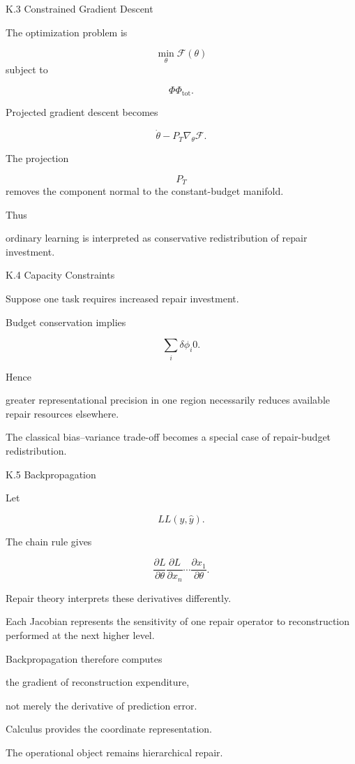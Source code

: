 \documentclass[12pt,oneside]{article}
\theoremstyle{plain}
\theoremstyle{definition}
\theoremstyle{remark}
\begin{document}
K.3 Constrained Gradient Descent

The optimization problem is

\[
\min_\theta
\mathcal F(\theta)
\]
subject to

\[
\Phi
\Phi_{\mathrm{tot}}.
\]

Projected gradient descent becomes

\[
\dot\theta
- 

P_T
\nabla_\theta
\mathcal F.
\]

The projection

\[
P_T
\]
removes the component normal to the constant-budget manifold.

Thus

ordinary learning is interpreted as conservative redistribution of repair investment.


K.4 Capacity Constraints

Suppose one task requires increased repair investment.

Budget conservation implies

\[
\sum_i
\delta\phi_i
0. 

\]

Hence

greater representational precision in one region necessarily reduces available repair resources elsewhere.

The classical bias–variance trade-off becomes a special case of repair-budget redistribution.


K.5 Backpropagation

Let

\[
L
L(y,\hat y).
\]

The chain rule gives

\[
\frac{\partial L}
{\partial\theta}
\frac{\partial L}
{\partial x_n}
\cdots
\frac{\partial x_1}
{\partial\theta}.
\]

Repair theory interprets these derivatives differently.

Each Jacobian represents the sensitivity of one repair operator to reconstruction performed at the next higher level.

Backpropagation therefore computes

the gradient of reconstruction expenditure,

not merely the derivative of prediction error.

Calculus provides the coordinate representation.

The operational object remains hierarchical repair.
\end{document}

